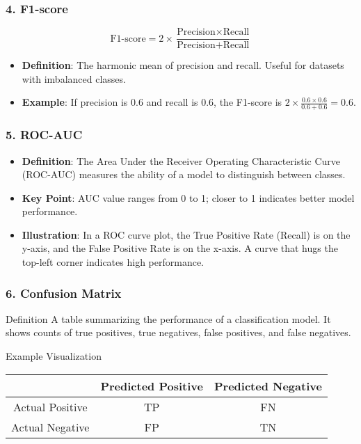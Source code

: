\documentclass[aspectratio=169]{beamer}
\begin{document}
\begin{frame}[fragile]
    \frametitle{4. F1-score}
    \begin{equation}
        \text{F1-score} = 2 \times \frac{\text{Precision} \times \text{Recall}}{\text{Precision} + \text{Recall}}
    \end{equation}
    \begin{itemize}
        \item \textbf{Definition}: The harmonic mean of precision and recall. Useful for datasets with imbalanced classes.
        \item \textbf{Example}: If precision is 0.6 and recall is 0.6, the F1-score is \( 2 \times \frac{0.6 \times 0.6}{0.6 + 0.6} = 0.6 \).
    \end{itemize}
\end{frame}

\begin{frame}[fragile]
    \frametitle{5. ROC-AUC}
    \begin{itemize}
        \item \textbf{Definition}: The Area Under the Receiver Operating Characteristic Curve (ROC-AUC) measures the ability of a model to distinguish between classes.
        \item \textbf{Key Point}: AUC value ranges from 0 to 1; closer to 1 indicates better model performance.
        \item \textbf{Illustration}: In a ROC curve plot, the True Positive Rate (Recall) is on the y-axis, and the False Positive Rate is on the x-axis. A curve that hugs the top-left corner indicates high performance.
    \end{itemize}
\end{frame}

\begin{frame}[fragile]
    \frametitle{6. Confusion Matrix}
    \begin{block}{Definition}
        A table summarizing the performance of a classification model. It shows counts of true positives, true negatives, false positives, and false negatives.
    \end{block}
    \begin{block}{Example Visualization}
        \begin{center}
        \begin{tabular}{|c|c|c|}
        \hline
                 & Predicted Positive & Predicted Negative \\ \hline
        Actual Positive &        TP          &         FN         \\ \hline
        Actual Negative &        FP          &         TN         \\ \hline
        \end{tabular}
        \end{center}
    \end{block}
\end{frame}
\end{document}
